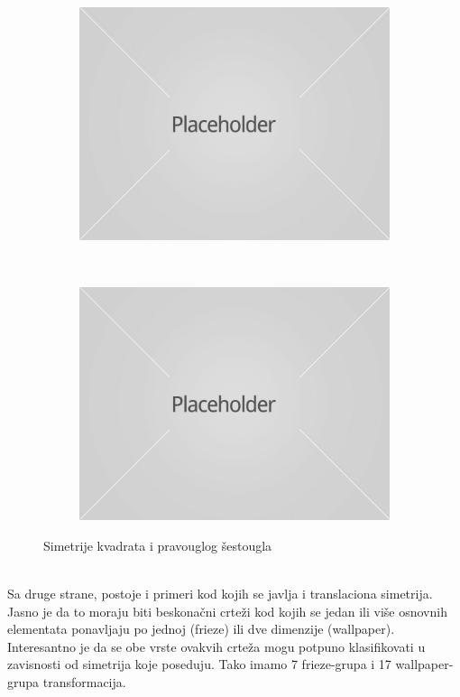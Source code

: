 \documentclass[times, utf8, diplomski]{fer}
\theoremstyle{plain}
\theoremstyle{definition}
\begin{document}
\begin{figure}[h]
\centering
\begin{subfigure}{0.4\textwidth}
\includegraphics[width=\textwidth]{placeholder}
\end{subfigure}
~
\begin{subfigure}{0.4\textwidth}
\includegraphics[width=\textwidth]{placeholder}
\end{subfigure}
\caption{Simetrije kvadrata i pravouglog \v sestougla}
\end{figure}\\
Sa druge strane, postoje i primeri kod kojih se javlja i translaciona simetrija. Jasno je da to moraju biti beskona\v cni crte\v zi kod kojih se jedan ili vi\v se osnovnih elementata ponavljaju po jednoj (frieze) ili dve dimenzije (wallpaper). Interesantno je da se obe vrste ovakvih crte\v za mogu potpuno klasifikovati u zavisnosti od simetrija koje poseduju. Tako imamo 7 frieze-grupa i 17 wallpaper-grupa transformacija.
\end{document}
